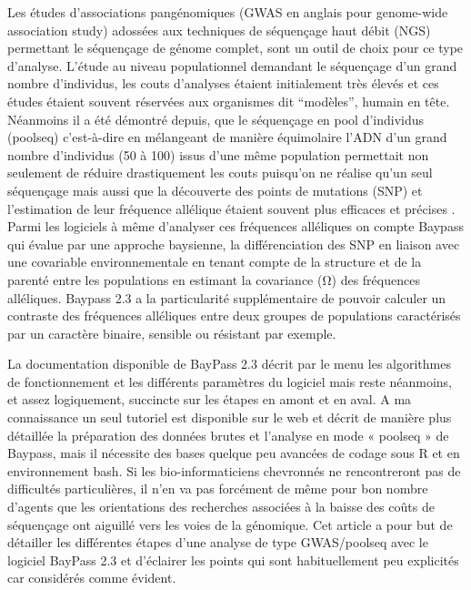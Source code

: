 \documentclass[
  openany]{book}
\theoremstyle{definition}
\theoremstyle{definition}
\theoremstyle{definition}
\theoremstyle{definition}
\theoremstyle{remark}
\begin{document}
Les études d'associations pangénomiques (GWAS en anglais pour genome-wide association study) adossées aux techniques de séquençage haut débit (NGS) permettant le séquençage de génome complet, sont un outil de choix pour ce type d'analyse. L'étude au niveau populationnel demandant le séquençage d'un grand nombre d'individus, les couts d'analyses étaient initialement très élevés et ces études étaient souvent réservées aux organismes dit ``modèles'', humain en tête. Néanmoins il a été démontré depuis, que le séquençage en pool d'individus (poolseq) c'est-à-dire en mélangeant de manière équimolaire l'ADN d'un grand nombre d'individus (50 à 100) issus d'une même population permettait non seulement de réduire drastiquement les couts puisqu'on ne réalise qu'un seul séquençage mais aussi que la découverte des points de mutations (SNP) et l'estimation de leur fréquence allélique étaient souvent plus efficaces et précises \citep{futschik_next_2010}. Parmi les logiciels à même d'analyser ces fréquences alléliques on compte Baypass \citep{gautier_genome-wide_2015} qui évalue par une approche baysienne, la différenciation des SNP en liaison avec une covariable environnementale en tenant compte de la structure et de la parenté entre les populations en estimant la covariance (Ω) des fréquences alléliques. Baypass 2.3 a la particularité supplémentaire de pouvoir calculer un contraste des fréquences alléliques entre deux groupes de populations caractérisés par un caractère binaire, sensible ou résistant par exemple.

La documentation disponible de BayPass 2.3 décrit par le menu les algorithmes de fonctionnement et les différents paramètres du logiciel mais reste néanmoins, et assez logiquement, succincte sur les étapes en amont et en aval. A ma connaissance un seul tutoriel est disponible sur le web \citep{nielsen_pool-seq_2020} et décrit de manière plus détaillée la préparation des données brutes et l'analyse en mode « poolseq » de Baypass, mais il nécessite des bases quelque peu avancées de codage sous R et en environnement bash. Si les bio-informaticiens chevronnés ne rencontreront pas de difficultés particulières, il n'en va pas forcément de même pour bon nombre d'agents que les orientations des recherches associées à la baisse des coûts de séquençage ont aiguillé vers les voies de la génomique. Cet article a pour but de détailler les différentes étapes d'une analyse de type GWAS/poolseq avec le logiciel BayPass 2.3 et d'éclairer les points qui sont habituellement peu explicités car considérés comme évident.
\end{document}
